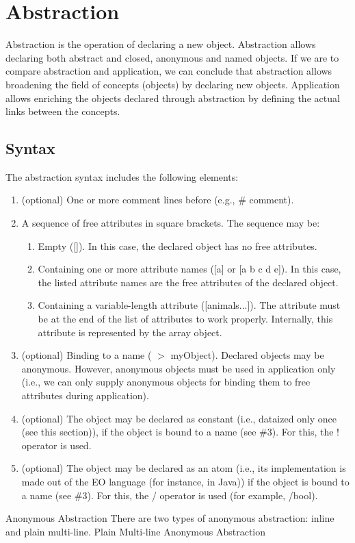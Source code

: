 \documentclass[12pt]{book}
\begin{document}
\section{Abstraction}
Abstraction is the operation of declaring a new object. Abstraction allows declaring both abstract and closed, anonymous and named objects.
If we are to compare abstraction and application, we can conclude that abstraction allows broadening the field of concepts (objects) by declaring new objects. Application allows enriching the objects declared through abstraction by defining the actual links between the concepts.

\subsection{Syntax}
The abstraction syntax includes the following elements:

\begin{enumerate}
    \item (optional) One or more comment lines before (e.g., \# comment).
    \item A sequence of free attributes in square brackets. The sequence may be:
    \begin{enumerate}
        \item Empty ([]). In this case, the declared object has no free attributes.
        \item Containing one or more attribute names ([a] or [a b c d e]). In this case, the listed attribute names are the free attributes of the declared object.
        \item Containing a variable-length attribute ([animals...]). The attribute must be at the end of the list of attributes to work properly. Internally, this attribute is represented by the array object.
    \end{enumerate}
    \item (optional) Binding to a name ( $>$ myObject). Declared objects may be anonymous. However, anonymous objects must be used in application only (i.e., we can only supply anonymous objects for binding them to free attributes during application).
    \item (optional) The object may be declared as constant (i.e., dataized only once (see this section)), if the object is bound to a name (see \#3). For this, the ! operator is used.
    \item (optional) The object may be declared as an atom (i.e., its implementation is made out of the EO language (for instance, in Java)) if the object is bound to a name (see \#3). For this, the / operator is used (for example, /bool).
\end{enumerate}
Anonymous Abstraction
There are two types of anonymous abstraction: inline and plain multi-line.
Plain Multi-line Anonymous Abstraction
\end{document}
